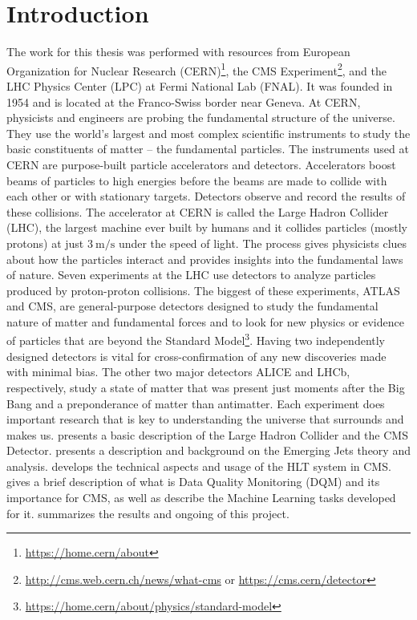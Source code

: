 \chapter{Introduction}

The work for this thesis was performed with resources from European Organization for Nuclear Research (CERN)\footnote{\url{https://home.cern/about}}, the CMS Experiment\footnote{\url{http://cms.web.cern.ch/news/what-cms} or \url{https://cms.cern/detector}}, and the LHC Physics Center (LPC) at Fermi National Lab (FNAL).
It was founded in 1954 and is located at the Franco-Swiss border near Geneva. At CERN, physicists and engineers are probing the fundamental structure of the universe. They use the world's largest and most complex scientific instruments to study the basic constituents of matter – the fundamental particles.
The instruments used at CERN are purpose-built particle accelerators and detectors. Accelerators boost beams of particles to high energies before the beams are made to collide with each other or with stationary targets. Detectors observe and record the results of these collisions. The accelerator at CERN is called the Large Hadron Collider (LHC), the largest machine ever built by humans and it collides particles (mostly protons) at just
 $\qty[per-mode = symbol]{3}{\meter\per\second}$ under the speed of light.
 The process gives physicists clues about how the particles interact and provides insights into the fundamental laws of nature. Seven experiments at the LHC use detectors to analyze particles produced by proton-proton collisions. The biggest of these experiments, ATLAS and CMS, are general-purpose detectors designed to study the
 fundamental nature of matter and fundamental forces and to look for new physics or evidence of particles that are beyond the Standard Model\footnote{\url{https://home.cern/about/physics/standard-model}}. Having two independently designed detectors is vital for cross-confirmation of any new discoveries made with minimal bias. The other two major detectors ALICE and LHCb, respectively, study a state of matter that was present just moments after the Big Bang and a preponderance of matter than antimatter.  Each experiment does important research that is key to understanding the universe that surrounds and makes us.
 presents a basic description of the Large Hadron Collider and the CMS Detector.
 presents a description and background on the Emerging Jets theory and analysis.
 develops the technical aspects and usage of the HLT system in CMS.
 gives a brief description of what is Data Quality Monitoring (DQM) and its importance for CMS, as well as describe the Machine Learning tasks developed for it.
 summarizes the results and ongoing of this project.
